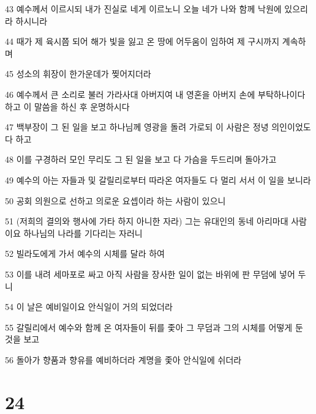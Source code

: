 \par 43 예수께서 이르시되 내가 진실로 네게 이르노니 오늘 네가 나와 함께 낙원에 있으리라 하시니라
\par 44 때가 제 육시쯤 되어 해가 빛을 잃고 온 땅에 어두움이 임하여 제 구시까지 계속하며
\par 45 성소의 휘장이 한가운데가 찢어지더라
\par 46 예수께서 큰 소리로 불러 가라사대 아버지여 내 영혼을 아버지 손에 부탁하나이다 하고 이 말씀을 하신 후 운명하시다
\par 47 백부장이 그 된 일을 보고 하나님께 영광을 돌려 가로되 이 사람은 정녕 의인이었도다 하고
\par 48 이를 구경하러 모인 무리도 그 된 일을 보고 다 가슴을 두드리며 돌아가고
\par 49 예수의 아는 자들과 및 갈릴리로부터 따라온 여자들도 다 멀리 서서 이 일을 보니라
\par 50 공회 의원으로 선하고 의로운 요셉이라 하는 사람이 있으니
\par 51 (저희의 결의와 행사에 가타 하지 아니한 자라) 그는 유대인의 동네 아리마대 사람이요 하나님의 나라를 기다리는 자러니
\par 52 빌라도에게 가서 예수의 시체를 달라 하여
\par 53 이를 내려 세마포로 싸고 아직 사람을 장사한 일이 없는 바위에 판 무덤에 넣어 두니
\par 54 이 날은 예비일이요 안식일이 거의 되었더라
\par 55 갈릴리에서 예수와 함께 온 여자들이 뒤를 좇아 그 무덤과 그의 시체를 어떻게 둔 것을 보고
\par 56 돌아가 향품과 향유를 예비하더라 계명을 좇아 안식일에 쉬더라

\chapter{24}

